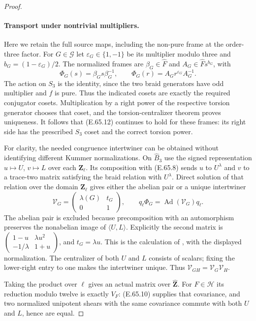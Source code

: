 \begin{proof}
\paragraph{Transport under nontrivial multipliers.}
Here we retain the full source maps, including the non-pure frame
at the order-three factor. For $G\in\mathcal G$ let
$\varepsilon_G\in\{1,-1\}$ be its multiplier modulo three and
$b_G=(1-\varepsilon_G)/2$. The normalized frames are
$\beta_G\in\widehat F$ and $A_G\in\widehat F s^{b_G}$, with
\[
 \Phi_G(s)=\beta_Gs\beta_G^{-1},\qquad
 \Phi_G(r)=A_Gr^{\varepsilon_G}A_G^{-1}.
 \tag{E.65.14}
\]
The action on $S_3$ is the identity, since the two braid generators
have odd multiplier and $f$ is pure. Thus the indicated cosets
are exactly the required conjugator cosets. Multiplication by a
right power of the respective torsion generator chooses that
coset, and the torsion-centralizer theorem proves uniqueness.
It follows that \textup{(E.65.12)} continues to hold for these
frames: its right side has the prescribed $S_3$ coset and the
correct torsion power.

For clarity, the needed congruence intertwiner can be obtained
without identifying different Kummer normalizations. On
$\widehat B_3$ use the signed representation $u\mapsto U$,
$v\mapsto L$ over each $\mathbf Z_\ell$. Its composition with
\textup{(E.65.8)} sends $u$ to $U^\lambda$ and $v$ to a
trace-two matrix satisfying the braid relation with $U^\lambda$.
Direct solution of that relation over the domain $\mathbf Z_\ell$
gives either the abelian pair or a unique intertwiner
\[
 \mathcal V_G=\begin{pmatrix}\lambda(G)&t_G\\0&1\end{pmatrix},
 \qquad
 q_\ell\Phi_G=\operatorname{Ad}(\mathcal V_G)q_\ell.
 \tag{E.65.15}
\]
The abelian pair is excluded because precomposition with an
automorphism preserves the nonabelian image of $\langle U,L\rangle$.
Explicitly the second matrix is
$\left(\begin{smallmatrix}1-u&\lambda u^2\\-1/\lambda&1+u\end{smallmatrix}\right)$,
and $t_G=\lambda u$. This is the calculation of
\cite[Lemmas 4.1--4.3]{DE_Marin2008}, with the displayed normalization.
The centralizer of both $U$ and $L$ consists of scalars; fixing the
lower-right entry to one makes the intertwiner unique. Thus
$\mathcal V_{GH}=\mathcal V_G\mathcal V_H$.

Taking the product over $\ell$ gives an actual matrix over
$\widehat{\mathbf Z}$. For $F\in\mathcal H$ its reduction modulo
twelve is exactly $V_F$: \textup{(E.65.10)} supplies that covariance,
and two normalized unipotent shears with the same covariance
commute with both $U$ and $L$, hence are equal.


\end{proof}
